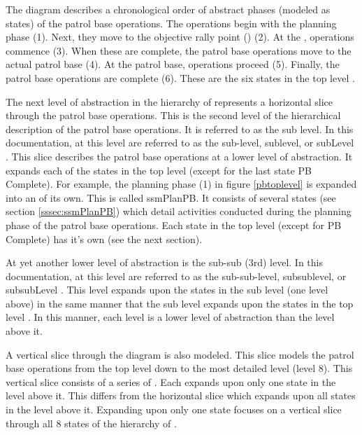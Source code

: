 \documentclass[../../main/main.tex]{subfiles}
\begin{document}
The diagram describes a chronological order of abstract phases (modeled as states) of the patrol base operations.  The operations begin with the planning phase (1).  Next, they move to the objective rally point () (2). At the , operations commence (3).  When these are complete, the patrol base operations move to the actual patrol base (4).  At the patrol base, operations proceed (5).  Finally, the patrol base operations are complete (6).  These are the six states in the top level .


The next level of abstraction in the hierarchy of  represents a horizontal slice through the patrol base operations.  This is the second level of the hierarchical description of the patrol base operations. It is referred to as the sub level.  In this documentation,  at this level are referred to as the sub-level, sublevel, or subLevel . This slice describes the patrol base operations at a lower level of abstraction.  It expands each of the states in the top level (except for the last state PB Complete).  For example, the planning phase (1) in figure \ref{pbtoplevel} is expanded into an  of its own.  This is called ssmPlanPB.  It consists of several states (see section \ref{sssec:ssmPlanPB}) which detail activities conducted during the planning phase of the patrol base operations.  Each state in the top level (except for PB Complete) has it's own  (see the next section).

At yet another lower level of abstraction is the sub-sub (3rd) level.  In this documentation,  at this level are referred to as the sub-sub-level, subsublevel, or subsubLevel .  This level expands upon the states in the sub level (one level above) in the same manner that the sub level expands upon the states in the top level .  In this manner, each level is a lower level of abstraction than the level above it. 

A vertical slice through the diagram is also modeled.  This slice models the patrol base operations from the top level down to the most detailed level (level 8).  This vertical slice consists of a series of .  Each  expands upon only one state in the level above it.  This differs from the horizontal slice which expands upon all states in the level above it.  Expanding upon only one state focuses on a vertical slice through all 8 states of the hierarchy of .
\end{document}
